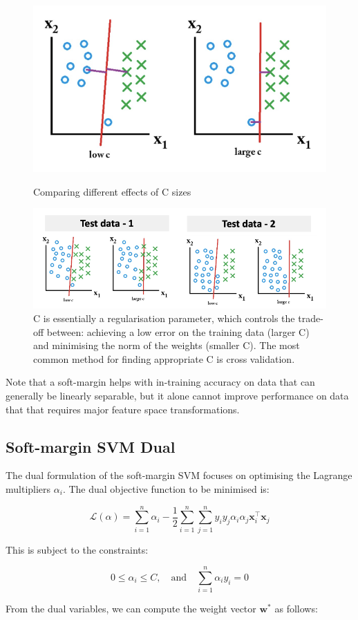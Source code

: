 \begin{figure}[H]
    \centering
\includegraphics[width=0.5\linewidth]{img/large-small-margin.png}
    \caption{Comparing different effects of C sizes}
    
    \includegraphics[width=0.8\linewidth]{img/svm_C.png}
    \caption{C is essentially a regularisation parameter, which controls the trade-off between: achieving a low error on the training data (larger C) and minimising the norm of the weights (smaller C). The most common method for finding appropriate C is cross validation.}
    
\end{figure}

Note that a soft-margin helps with in-training accuracy on data that can generally be linearly separable, but it alone cannot improve performance on data that that requires major feature space transformations.

\subsection{Soft-margin SVM Dual}

The dual formulation of the soft-margin SVM focuses on optimising the Lagrange multipliers \(\alpha_i\). The dual objective function to be minimised is:

\[
\mathcal{L}(\alpha) = \sum_{i=1}^{n} \alpha_i - \frac{1}{2} \sum_{i=1}^{n} \sum_{j=1}^{n} y_i y_j \alpha_i \alpha_j  \mathbf{x}_i^\top \mathbf{x}_j 
\]

This is subject to the constraints:

\[
0 \leq \alpha_i \leq C, \quad \text{and} \quad \sum_{i=1}^{n} \alpha_i y_i = 0
\]

From the dual variables, we can compute the weight vector \(\mathbf{w}^*\) as follows:

